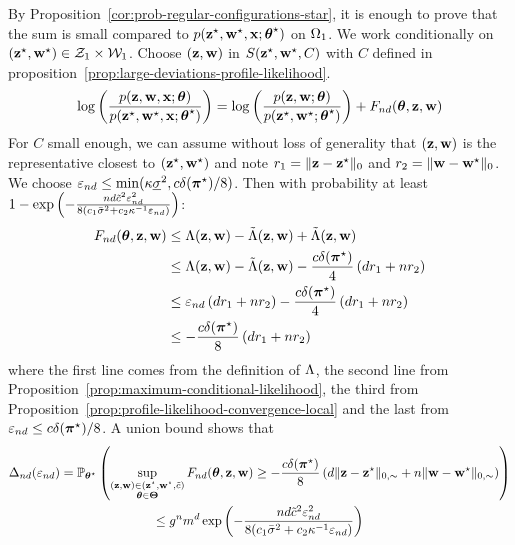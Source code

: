 \proofbegin
By Proposition~\ref{cor:prob-regular-configurations-star}, it is enough to prove that the sum is small compared to $p(\mathbf{z}^\star, \mathbf{w}^\star, \mathbf{x}; \boldsymbol{\theta}^\star)$ on $\Omega_1$. We work conditionally on $(\mathbf{z}^\star, \mathbf{w}^\star) \in \mathcal{Z}_1 \times \mathcal{W}_1$. Choose $(\mathbf{z}, \mathbf{w})$ in $S(\mathbf{z}^\star, \mathbf{w}^\star, C)$ with $C$ defined in proposition~\ref{prop:large-deviations-profile-likelihood}. 
\begin{align*}
  \log \left( \frac{\prob(\bz, \bw, \bx; \btheta)}{\prob(\bzs, \bws, \bx; \bthetas)} \right) & = \log \left( \frac{\prob(\bz, \bw; \btheta)}{\prob(\bzs, \bws; \bthetas)}\right) + \Fnd(\btheta, \bz, \bw) \\
\end{align*}
For $C$ small enough, we can assume without loss of generality that $(\mathbf{z}, \mathbf{w})$ is the representative closest to $(\mathbf{z}^\star, \mathbf{w}^\star)$ and note $r_1 = \|\mathbf{z} - \mathbf{z}^\star\|_0$ and $r_2 = \|\mathbf{w} - \mathbf{w}^\star\|_0$. We choose $\varepsilon_{nd} \leq \min(\kappa \underline{\sigma}^2, c\delta(\boldsymbol{\pi}^\star)/8)$. Then with probability at least $1 - \exp\left( -\frac{nd\tilde{c}^2\varepsilon_{nd}^2}{8(c_1\bar{\sigma}^2 + c_2 \kappa^{-1} \varepsilon_{nd})} \right)$:
\begin{align*}
  \Fnd(\btheta, \bz, \bw) & \leq \Lamb(\bz, \bw) - \Lambtilde(\bz, \bw) + \Lambtilde(\bz, \bw) \\
  & \leq \Lamb(\bz, \bw) - \Lambtilde(\bz, \bw) - \frac{c\delta(\bals)}{4}\left(\dd r_1 + \n r_2\right) \\
  & \leq \vareps_{\n\dd} \left(\dd r_1 + \n r_2\right) - \frac{c\delta(\bals)}{4}\left(\dd r_1 + \n r_2\right) \\
  & \leq - \frac{c\delta(\bals)}{8}\left(\dd r_1 + \n r_2\right) \\
\end{align*}
where the first line comes from the definition of $\Lambda$, the second line from Proposition~\ref{prop:maximum-conditional-likelihood}, the third from Proposition~\ref{prop:profile-likelihood-convergence-local} and the last from $\varepsilon_{nd} \leq c\delta(\boldsymbol{\pi}^\star)/8$. A union bound shows that
\begin{multline*}
  \Delta_{\n\dd}(\vareps_{\n\dd}) = \Prob_{\bthetas} \left( \sup_{\substack{(\bz, \bw) \in (\bzs, \bws, \tilde{c}) \\ \btheta \in \bTheta}} \Fnd(\btheta, \bz, \bw) \geq - \frac{c\delta(\bals)}{8}\left(\dd \|\bz - \bzs\|_{0,\sim}  + \n \|\bw - \bws\|_{0, \sim} \right) \right) \\ \leq \g^{\n}\m^{\dd} \exp\left( - \frac{\n\dd\tilde{c}^2\vareps_{\n\dd}^2}{8(c_1\vmax^2 + c_2 \neighborsize^{-1} \vareps_{\n\dd})} \right)
\end{multline*}

